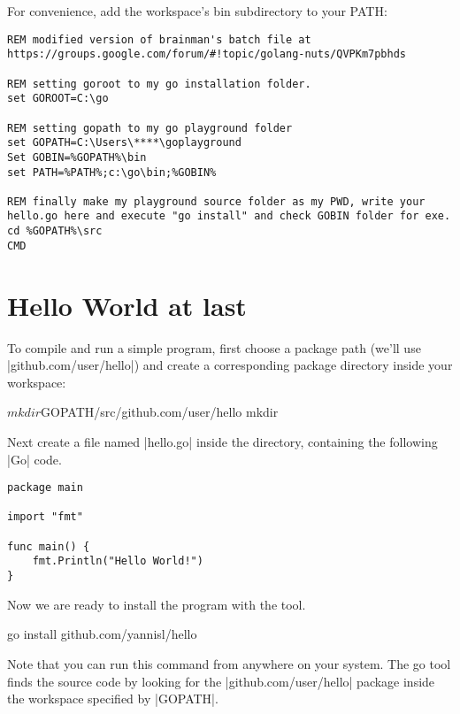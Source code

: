 For convenience, add the workspace's bin subdirectory to your PATH:


\begin{verbatim}
REM modified version of brainman's batch file at https://groups.google.com/forum/#!topic/golang-nuts/QVPKm7pbhds
 
REM setting goroot to my go installation folder.
set GOROOT=C:\go
 
REM setting gopath to my go playground folder
set GOPATH=C:\Users\****\goplayground
Set GOBIN=%GOPATH%\bin
set PATH=%PATH%;c:\go\bin;%GOBIN%
 
REM finally make my playground source folder as my PWD, write your hello.go here and execute "go install" and check GOBIN folder for exe.
cd %GOPATH%\src
CMD
\end{verbatim}



\section{Hello World at last}

To compile and run a simple program, first choose a package path (we'll use |github.com/user/hello|) and create a corresponding package directory inside your workspace:

\begin{teX}
$ mkdir $GOPATH/src/github.com/user/hello
mkdir %
\end{teX}

Next create a file named |hello.go| inside the directory, containing the
following |Go| code.

\begin{lstlisting}
package main

import "fmt"

func main() {
    fmt.Println("Hello World!")
}
\end{lstlisting}

Now we are ready to install the program with the \Go tool.

\begin{teX}
go install github.com/yannisl/hello
\end{teX}

Note that you can run this command from anywhere on your system. The go tool finds the source code by looking for the |github.com/user/hello| package inside the workspace specified by |GOPATH|.

